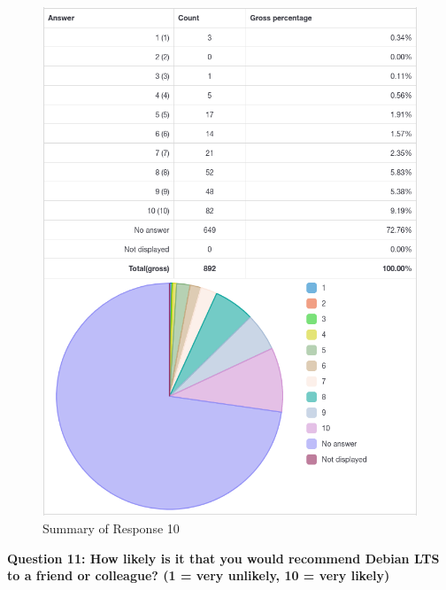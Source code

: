 \documentclass{article}
\begin{document}
\vspace{3mm}
\begin{figure}[h!]
\centering
\includegraphics[width=15.3cm]{assets/10-complete-responses.png}
\caption{Summary of Response 10}
\end{figure}

\newpage

\Large{\textbf{Question 11: How likely is it that you would recommend Debian LTS to a friend or
colleague? (1 = very unlikely, 10 = very likely)}}
\end{document}
